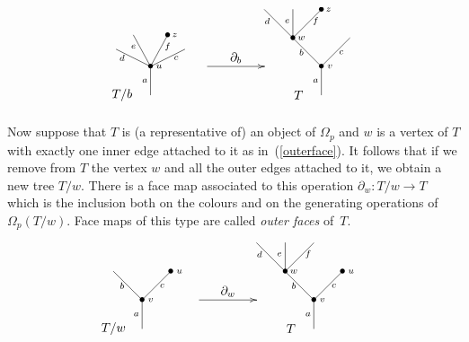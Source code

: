 \documentclass[a4paper]{amsart}
\theoremstyle{plain}
\theoremstyle{definition}
\theoremstyle{remark}
\newcommand{\rpd}{\Omega_p}
\newcommand{\To}{\longrightarrow}
\numberwithin{equation}{section}
\numberwithin{figure}{section}
\begin{document}
\begin{equation}
\xy<0.08cm,0cm>:
(-12,-4)*=0{}="t1";
(-6,1)*=0{}="t2";
(6,1)*=0{\bullet}="t3";
(12,-4)*=0{}="t4";
(0,-10)*=0{\bullet}="t5";
(0,-20)*=0{}="t6";
(40,10)*=0{}="5";
(50,10)*=0{}="6";
(60,10)*=0{\bullet}="7";
(50,0)*=0{\bullet}="8";
(70,0)*=0{}="9";
(60,-10)*=0{\bullet}="10";
(60,-20)*=0{}="11";
(-10,-7)*{\scriptstyle d};
(-6,-3)*{\scriptstyle e};
(6,-3)*{\scriptstyle f};
(9,-7)*{\scriptstyle c};
(-2,-15)*{\scriptstyle a};
(3,-10)*{\scriptstyle u};
(41,6)*{\scriptstyle d};
(48,6)*{\scriptstyle e};
(58,6)*{\scriptstyle f};
(53,-5)*{\scriptstyle b};
(67,-5)*{\scriptstyle c};
(63,-10)*{\scriptstyle v};
(58,-15)*{\scriptstyle a};
(53,0)*{\scriptstyle w};
(30,-7)*{\partial_b};
(8.5,1)*{\scriptstyle z};
(62.5,10)*{\scriptstyle z};
(-10,-20)*=0{T/b};
(52,-20)*=0{T};
(-10,-25)*=0{};
"t1";"t5" **\dir{-};
"t2";"t5" **\dir{-};
"t3";"t5" **\dir{-};
"t4";"t5" **\dir{-};
"t5";"t6" **\dir{-};
"5";"8" **\dir{-};
"6";"8" **\dir{-};
"7";"8" **\dir{-};
"8";"10" **\dir{-};
"9";"10" **\dir{-};
"10";"11" **\dir{-};
{\ar(20, -10)*{};(40,-10)*{}};
\endxy
\label{innerface}
\end{equation}


Now suppose that $T$ is (a representative of) an object of $\rpd$ and $w$ is a vertex of $T$ with exactly one inner edge
attached to it as in~(\ref{outerface}). It follows that if we remove from $T$ the vertex $w$ and all the outer edges
attached to it, we obtain a new tree $T/w$. There is a face map associated to this operation $\partial_w:T/w\To T$ which is
the inclusion both on the colours and on the generating operations of $\Omega_p(T/w)$. Face maps of this type are called \emph{outer faces} of~$T$.

\begin{equation}
\xy<0.08cm,0cm>:
(-10,0)*=0{}="1";
(10,0)*=0{\bullet}="2";
(0,-10)*=0{\bullet}="3";
(0,-20)*=0{}="4";
(40,10)*=0{}="5";
(50,10)*=0{}="6";
(60,10)*=0{}="7";
(50,0)*=0{\bullet}="8";
(70,0)*=0{\bullet}="9";
(60,-10)*=0{\bullet}="10";
(60,-20)*=0{}="11";
(13,0)*{\scriptstyle u};
(-7,-5)*{\scriptstyle b};
(7,-5)*{\scriptstyle c};
(3,-10)*{\scriptstyle v};
(-2,-15)*{\scriptstyle a};
(41,6)*{\scriptstyle d};
(48,6)*{\scriptstyle e};
(58,6)*{\scriptstyle f};
(53,-5)*{\scriptstyle b};
(67,-5)*{\scriptstyle c};
(63,-10)*{\scriptstyle v};
(58,-15)*{\scriptstyle a};
(73,0)*{\scriptstyle u};
(53,0)*{\scriptstyle w};
(30,-7)*{\partial_w};
(-10,-20)*=0{T/w};
(-10,-25)*=0{};
(52,-20)*=0{T};
"1";"3" **\dir{-};
"2";"3" **\dir{-};
"3";"4" **\dir{-};
"5";"8" **\dir{-};
"6";"8" **\dir{-};
"7";"8" **\dir{-};
"8";"10" **\dir{-};
"9";"10" **\dir{-};
"10";"11" **\dir{-};
{\ar(20, -10)*{};(40,-10)*{}};
\endxy
\label{outerface}
\end{equation}
\end{document}
